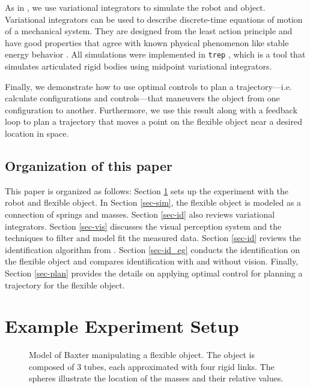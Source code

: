 \documentclass[runningheads,a4paper]{llncs}
\begin{document}
As in \cite{caldwell_coleman_correll_iros}, we use variational integrators to simulate the robot and object.  Variational integrators can be used to describe discrete-time equations of motion of a mechanical system.  They are designed from the least action principle and have good properties that agree with known physical phenomenon like stable energy behavior \cite{pekarek_murphey}. All simulations were implemented in \texttt{trep} \cite{johnson_murphey_scalable,johnson_murphey_linearization}, which is a tool that simulates articulated rigid bodies using midpoint variational integrators.

Finally, we demonstrate how to use optimal controls to plan a trajectory---i.e. calculate configurations and controls---that maneuvers the object from one configuration to another. Furthermore, we use this result along with a feedback loop to plan a trajectory that moves a point on the flexible object near a desired location in space.

\subsection{Organization of this paper}
This paper is organized as follows: Section \ref{sec-exp} sets up the experiment with the robot and flexible object. In Section \ref{sec-sim}, the flexible object is modeled as a connection of springs and masses. Section \ref{sec-id} also reviews variational integrators. Section \ref{sec-vis} discusses the visual perception system and the techniques to filter and model fit the measured data. Section \ref{sec-id} reviews the identification algorithm from \cite{caldwell_coleman_correll_iros}. Section \ref{sec-id_eg} conducts the identification on the flexible object and compares identification with and without vision. Finally, Section \ref{sec-plan} provides the details on applying optimal control for planning a trajectory for the flexible object.

\section{Example Experiment Setup}
\label{sec-exp}
\begin{figure}[!htb]
\centering
\def\svgwidth{.6\textwidth}%

\caption{Model of Baxter manipulating a flexible object. The object is composed of 3 tubes, each approximated with four rigid links. The spheres illustrate the location of the masses and their relative values. }
\label{fig-baxter_y_sim}
\end{figure}
\end{document}
